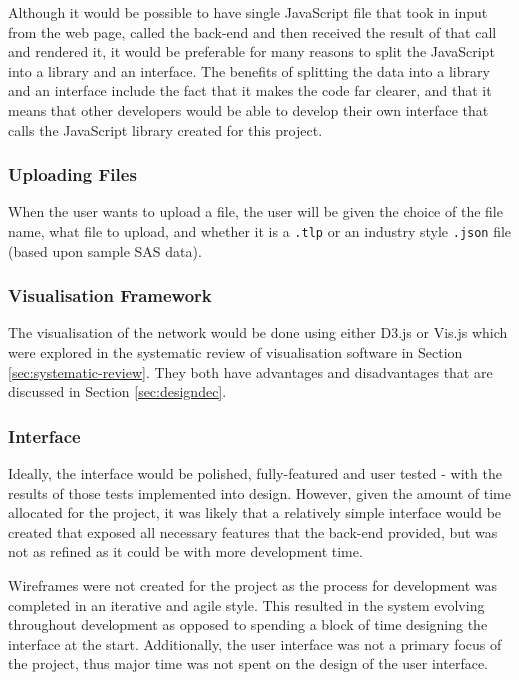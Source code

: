 \documentclass[../dissertation.tex]{subfiles}
\begin{document}
Although it would be possible to have single JavaScript file that took in input from the web page, called the back-end and then received the result of that call and rendered it, it would be preferable for many reasons to split the JavaScript into a library and an interface. The benefits of splitting the data into a library and an interface include the fact that it makes the code far clearer, and that it means that other developers would be able to develop their own interface that calls the JavaScript library created for this project.

\subsubsection{Uploading Files}

When the user wants to upload a file, the user will be given the choice of the file name, what file to upload, and whether it is a \texttt{.tlp} or an industry style \texttt{.json} file (based upon sample SAS data).

\subsubsection{Visualisation Framework}

The visualisation of the network would be done using either D3.js or Vis.js which were explored in the systematic review of visualisation software in Section \ref{sec:systematic-review}. They both have advantages and disadvantages that are discussed in Section \ref{sec:designdec}. 

\subsubsection{Interface}

Ideally, the interface would be polished, fully-featured and user tested - with the results of those tests implemented into design. However, given the amount of time allocated for the project, it was likely that a relatively simple interface would be created that exposed all necessary features that the back-end provided, but was not as refined as it could be with more development time.

Wireframes were not created for the project as the process for development was completed in an iterative and agile style. This resulted in the system evolving throughout development as opposed to spending a block of time designing the interface at the start. Additionally, the user interface was not a primary focus of the project, thus major time was not spent on the design of the user interface.
\end{document}
